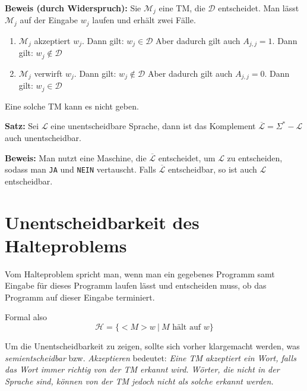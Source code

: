 \documentclass{scrartcl}%
\begin{document}
    \vspace*{0.3cm}
    \textbf{\textsf{Beweis (durch Widerspruch):}} Sie $\mathcal{M}_j$ eine TM, die $\mathcal{D}$ entscheidet.
    Man lässt $\mathcal{M}_j$ auf der Eingabe $w_j$ laufen und erhält zwei Fälle.

    \begin{enumerate}
        \item $\mathcal{M}_j$ akzeptiert $w_j$. Dann gilt: $  w_j \in \mathcal{D}$ \newline
        Aber dadurch gilt auch $A_{j,j} = 1$. Dann gilt: $w_j \notin \mathcal{D}$
        \item $\mathcal{M}_j$ verwirft $w_j$. Dann gilt: $w_j \notin \mathcal{D}$ \newline
        Aber dadurch gilt auch $A_{j,j} = 0$. Dann gilt: $w_j \in \mathcal{D}$
    \end{enumerate}

    Eine solche TM kann es nicht geben.\proofend

    \vspace*{0.3cm}
    \textbf{\textsf{Satz:}} Sei $\mathcal{L}$ eine unentscheidbare Sprache,
    dann ist das Komplement $\overline{\mathcal{L}} = \Sigma^* - \mathcal{L}$ auch unentscheidbar.

    \vspace*{0.3cm}
    \textbf{\textsf{Beweis:}} Man nutzt eine Maschine, die $\overline{\mathcal{L}}$ entscheidet,
    um $\mathcal{L}$ zu entscheiden, sodass man \texttt{JA} und \texttt{NEIN} vertauscht.
    Falls $\overline{\mathcal{L}}$ entscheidbar, so ist auch $\mathcal{L}$ entscheidbar.\proofend

    \section*{Unentscheidbarkeit des Halteproblems}
    Vom Halteproblem spricht man, wenn man ein gegebenes Programm samt Eingabe für dieses Programm laufen lässt
    und entscheiden muss, ob das Programm auf dieser Eingabe terminiert.

    Formal also
    \begin{equation*}
        \mathcal{H} = \{ <M>w \ | \ M \text{ hält auf } w \}
    \end{equation*}

    Um die Unentscheidbarkeit zu zeigen, sollte sich vorher klargemacht werden,
    was \textit{semientscheidbar} bzw. \textit{Akzeptieren} bedeutet:
    \textit{Eine TM akzeptiert ein Wort, falls das Wort immer richtig von der TM erkannt wird.
    Wörter, die nicht in der Sprache sind, können von der TM jedoch nicht als solche erkannt werden.}
\end{document}
